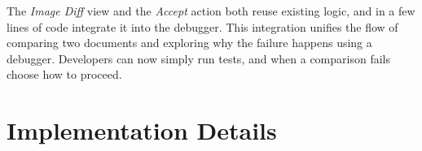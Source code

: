 \documentclass[sigplan,screen]{acmart} %
\newcommand\on[1]{\nbc{ON}{#1}{olive}} %
\begin{document}
The \emph{Image Diff} view and the \emph{Accept} action both reuse existing logic, and in a few lines of code integrate it into the debugger.
This integration unifies the flow of comparing two documents and exploring why the failure happens using a debugger.
Developers can now simply run tests, and when a comparison fails choose how to proceed.

%
%

\section{Implementation Details}\label{sec:implementation}


\end{document}

